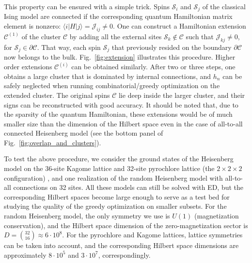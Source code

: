 This property can be ensured with a simple trick. Spins $\mathcal{S}_i$ and $\mathcal{S}_j$ of the classical Ising model are connected if the corresponding quantum Hamiltonian matrix element is nonzero: $\langle i | H | j \rangle = \mathcal{J}_{ij} \neq 0$. One can construct a Hamiltonian extension $\mathcal{C}^{(1)}$ of the cluster $\mathcal{C}$ by adding all the external sites $\mathcal{S}_k \notin \mathcal{C}$ such that $\mathcal{J}_{kj} \neq 0$, for $\mathcal{S}_j \in \partial \mathcal{C}$.  That way, each spin $\mathcal{S}_j$ that previously resided on the boundary $\partial \mathcal{C}$ now belongs to the bulk. Fig.~\ref{fig:extension} illustrates this procedure. Higher order extensions $\mathcal{C}^{(i)}$ can be obtained similarly. After two or three steps, one obtains a large cluster that is dominated by internal connections, and $h_n$ can be safely neglected when running combinatorial/greedy optimization on the extended cluster. The original spins $\mathcal{C}$ lie deep inside the larger cluster, and their signs can be reconstructed with good accuracy. It should be noted that, due to the sparsity of the quantum Hamiltonian, these extensions would be of much smaller size than the dimension of the Hilbert space even in the case of all-to-all connected Heisenberg model (see the bottom panel of Fig.~\ref{fig:overlap_and_clusters}).

To test the above procedure, we consider the ground states of the Heisenberg model on the 36-site Kagome lattice \cite{kagome36} and 32-site pyrochlore lattice (the $2\times 2\times 2$ configuration) \cite{astrakhantsev2021}, and one realization of the random Heisenberg model with all-to-all connections on 32 sites. All these models can still be solved with ED, but the corresponding Hilbert spaces become large enough to serve as a test bed for studying the quality of the greedy optimization on smaller subsets. For the random Heisenberg model, the only symmetry we use is $U(1)$ (magnetization conservation), and the Hilbert space dimension of the zero-magnetization sector is $D = \binom{32}{16} \approx 6\cdot 10^8$. For the pyrochlore and Kagome lattices, lattice symmetries can be taken into account, and the corresponding Hilbert space dimensions are approximately $8 \cdot 10^5$ and $3 \cdot 10^7$, correspondingly.

